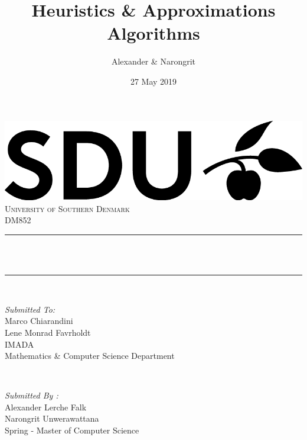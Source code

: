 \documentclass[12pt]{article}
\title{Heuristics \& Approximations Algorithms}								%
\author{Alexander \& Narongrit}								%
\date{27 May 2019}											%
\makeatletter
\let\thetitle\@title
\makeatother
\begin{document}

\begin{titlepage}
    \centering
    \vspace*{0.5 cm}
    \includegraphics[scale = 0.5]{SDU_logo.png}\\[1.0 cm]	%
    \textsc{\LARGE University of Southern Denmark}\\[2.0 cm]	%
    \textsc{\Large DM852}\\[0.5 cm]				%
    \rule{\linewidth}{0.2 mm} \\[0.4 cm]
    { \huge \bfseries \thetitle}\\
    \rule{\linewidth}{0.2 mm} \\[1.5 cm]
    
    \begin{minipage}{0.4\textwidth}
        \begin{flushleft} \large
            \emph{Submitted To:}\\
            Marco Chiarandini\\
            Lene Monrad Favrholdt \\
            IMADA \\
            Mathematics \& Computer Science Department \\
        \end{flushleft}
    \end{minipage}~
    \begin{minipage}{0.4\textwidth}
        
        \begin{flushright} \large
            \emph{Submitted By :} \\
            Alexander Lerche Falk\\
            Narongrit Unwerawattana\\
            Spring - Master of Computer Science\\
        \end{flushright}
        
    \end{minipage}\\[2 cm]
    
    
    
    
    
    
    
\end{titlepage}
\end{document}

